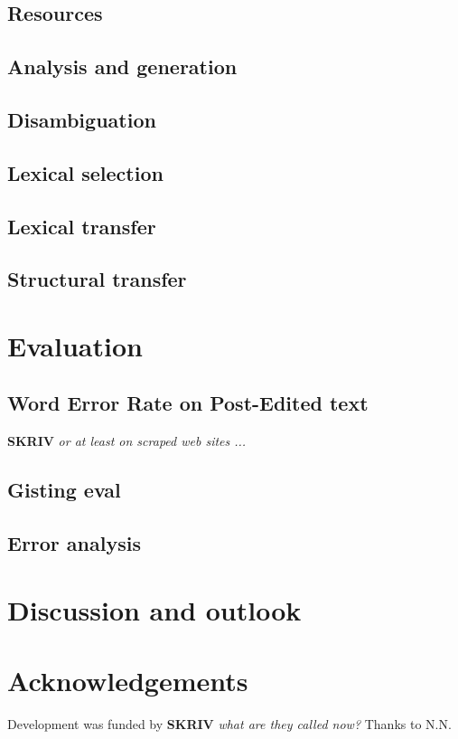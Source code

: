 \documentclass[11pt]{article}
\newcommand{\comment}[1]{\textbf{SKRIV} {\it #1}}
\begin{document}
  \label{sec:development}
\subsection{Resources}

\subsection{Analysis and generation}

\subsection{Disambiguation}
\subsection{Lexical selection}

\subsection{Lexical transfer}

\subsection{Structural transfer}
\label{sec:structural-transfer}

\section{Evaluation}
\label{sec:eval}



\subsection{Word Error Rate on Post-Edited text}
\label{sec:WER}
\comment{or at least on scraped web sites ...}
\subsection{Gisting eval}


\subsection{Error analysis}

\section{Discussion and outlook}

\section*{Acknowledgements}
Development was funded by \comment{what are they called now?}
Thanks to N.N.


\nocite{zubizarreta2009amt}



\end{document}
